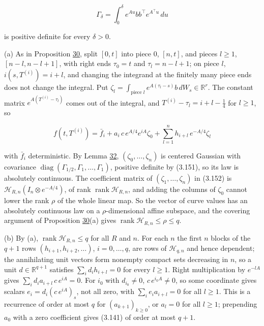 \documentclass[11pt]{article}
\begin{document}
\begin{equation*}
\Gamma_\delta=\int_0^\delta e^{Au}bb^\top e^{A^\top u}\,du \tag{3.151}\label{eq:3.151}
\end{equation*}

is positive definite for every \(\delta>0\).

(a) As in Proposition \hyperref[res:Proposition-30]{30}, split \([0,t]\) into piece 0, \([n,t]\), and pieces \(l\ge1\), \([n-l,n-l+1]\), with right ends \(\tau_0=t\) and \(\tau_l=n-l+1\); on piece \(l\), \(i(s,T^{(i)})=i+l\), and changing the integrand at the finitely many piece ends does not change the integral. Put \(\zeta_l=\int_{\text{piece }l}e^{A(\tau_l-s)}b\,dW_s\in\mathbb R^r\). The constant matrix \(e^{A(T^{(i)}-\tau_l)}\) comes out of the integral, and \(T^{(i)}-\tau_l=i+l-\tfrac14\) for \(l\ge1\), so

\begin{equation*}
f(t,T^{(i)})=\bar f_i+a_i\,c\,e^{A/4}e^{iA}\zeta_0+\sum_{l=1}^nh_{i+l}\,e^{-A/4}\zeta_l \tag{3.152}\label{eq:3.152}
\end{equation*}

with \(\bar f_i\) deterministic. By Lemma \hyperref[res:Lemma-32]{32}, \((\zeta_0,\dots,\zeta_n)\) is centered Gaussian with covariance \(\operatorname{diag}(\Gamma_{1/2},\Gamma_1,\dots,\Gamma_1)\), positive definite by (3.151), so its law is absolutely continuous. The coefficient matrix of \((\zeta_1,\dots,\zeta_n)\) in (3.152) is \(\mathcal H_{R,n}(I_n\otimes e^{-A/4})\), of rank \(\operatorname{rank}\mathcal H_{R,n}\), and adding the columns of \(\zeta_0\) cannot lower the rank \(\rho\) of the whole linear map. So the vector of curve values has an absolutely continuous law on a \(\rho\)-dimensional affine subspace, and the covering argument of Proposition \hyperref[res:Proposition-30]{30}(a) gives \(\operatorname{rank}\mathcal H_{R,n}\le\rho\le q\).

(b) By (a), \(\operatorname{rank}\mathcal H_{R,n}\le q\) for all \(R\) and \(n\). For each \(n\) the first \(n\) blocks of the \(q+1\) rows \((h_{i+1},h_{i+2},\dots)\), \(i=0,\dots,q\), are rows of \(\mathcal H_{q,n}\) and hence dependent; the annihilating unit vectors form nonempty compact sets decreasing in \(n\), so a unit \(d\in\mathbb R^{q+1}\) satisfies \(\sum_id_ih_{i+l}=0\) for every \(l\ge1\). Right multiplication by \(e^{-lA}\) gives \(\sum_id_ia_{i+l}\,c\,e^{iA}=0\). For \(i_0\) with \(d_{i_0}\neq0\), \(c\,e^{i_0A}\neq0\), so some coordinate gives scalars \(e_i=d_i(c\,e^{iA})_s\), not all zero, with \(\sum_ie_ia_{i+l}=0\) for all \(l\ge1\). This is a recurrence of order at most \(q\) for \((a_{k+1})_{k\ge0}\), or \(a_l=0\) for all \(l\ge1\); prepending \(a_0\) with a zero coefficient gives (3.141) of order at most \(q+1\).
\end{document}
